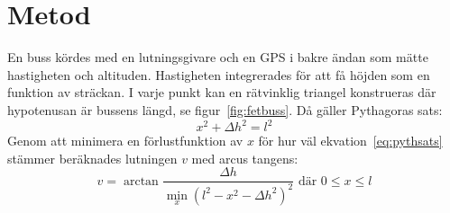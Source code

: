 \section{Metod}

En buss kördes med en lutningsgivare och en GPS i bakre ändan
som mätte hastigheten och altituden.
Hastigheten integrerades för att få höjden som en funktion av sträckan.
I varje punkt kan en rätvinklig triangel konstrueras
där hypotenusan är bussens längd, se figur~\ref{fig:fetbuss}.
Då gäller Pythagoras sats:
\begin{equation} \label{eq:pythsats}
	x^2 + \Delta h^2 = l^2
\end{equation}
Genom att minimera en förlustfunktion av $x$
för hur väl ekvation~\eqref{eq:pythsats} stämmer
beräknades lutningen $v$ med arcus tangens:
\begin{equation}
	v = \arctan \frac{\Delta h}{\min_x \left(l^2 - x^2 - \Delta h^2 \right)^2} \text{ där } 0 \leq x \leq l
\end{equation}

